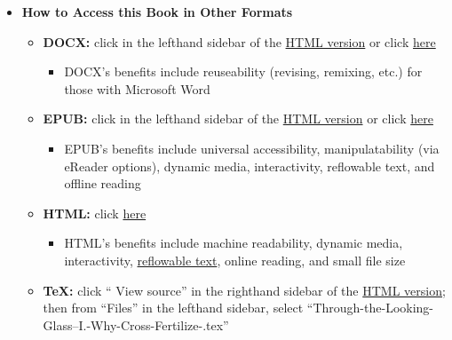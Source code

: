 \documentclass[
  letterpaper,
]{book}
\providecommand{\tightlist}{%
  \setlength{\itemsep}{0pt}\setlength{\parskip}{0pt}}\usepackage{longtable,booktabs,array}
\begin{document}
\begin{itemize}
\tightlist
\item
  \textbf{How to Access this Book in Other Formats}

  \begin{itemize}
  \tightlist
  \item
    \textbf{DOCX:} click in the lefthand sidebar of the
    \href{https://iulibscholcomm.github.io/through-the-looking-glass/}{HTML
    version} or click
    \href{https://iulibscholcomm.github.io/through-the-looking-glass/Through-the-Looking-Glass--I.-Why-Cross-Fertilize-.docx}{here}

    \begin{itemize}
    \tightlist
    \item
      DOCX's benefits include reuseability (revising, remixing, etc.)
      for those with Microsoft Word
    \end{itemize}
  \item
    \textbf{EPUB:} click in the lefthand sidebar of the
    \href{https://iulibscholcomm.github.io/through-the-looking-glass/}{HTML
    version} or click
    \href{https://iulibscholcomm.github.io/through-the-looking-glass/Through-the-Looking-Glass--I.-Why-Cross-Fertilize-.epub}{here}

    \begin{itemize}
    \tightlist
    \item
      EPUB's benefits include universal accessibility, manipulatability
      (via eReader options), dynamic media, interactivity, reflowable
      text, and offline reading
    \end{itemize}
  \item
    \textbf{HTML:} click
    \href{https://iulibscholcomm.github.io/through-the-looking-glass/}{here}

    \begin{itemize}
    \tightlist
    \item
      HTML's benefits include machine readability, dynamic media,
      interactivity,
      \href{https://en.wikipedia.org/wiki/Reflowable_document}{reflowable
      text}, online reading, and small file size
    \end{itemize}
  \item
    \textbf{TeX:} click `` View source'' in the righthand sidebar of the
    \href{https://iulibscholcomm.github.io/through-the-looking-glass/}{HTML
    version}; then from ``Files'' in the lefthand sidebar, select
    ``Through-the-Looking-Glass--I.-Why-Cross-Fertilize-.tex''


\end{itemize}
\end{itemize}
\end{document}
